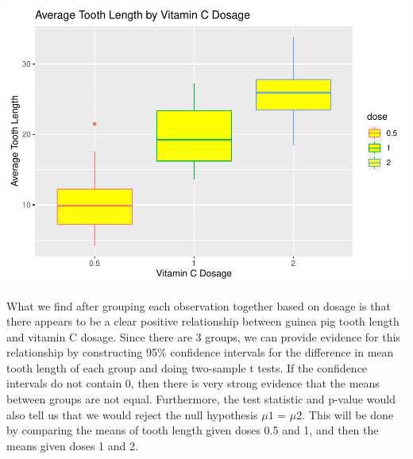 \documentclass[
]{article}
\newenvironment{Shaded}{\begin{snugshade}}{\end{snugshade}}
\newcommand{\DataTypeTok}[1]{\textcolor[rgb]{0.13,0.29,0.53}{#1}}
\newcommand{\KeywordTok}[1]{\textcolor[rgb]{0.13,0.29,0.53}{\textbf{#1}}}
\newcommand{\NormalTok}[1]{#1}
\newcommand{\OperatorTok}[1]{\textcolor[rgb]{0.81,0.36,0.00}{\textbf{#1}}}
\newcommand{\StringTok}[1]{\textcolor[rgb]{0.31,0.60,0.02}{#1}}
\begin{document}
\begin{Shaded}
\end{Shaded}

\includegraphics{C6Project_files/figure-latex/groupdose-1.pdf}

What we find after grouping each observation together based on dosage is
that there appears to be a clear positive relationship between guinea
pig tooth length and vitamin C dosage. Since there are 3 groups, we can
provide evidence for this relationship by constructing 95\% confidence
intervals for the difference in mean tooth length of each group and
doing two-sample t tests. If the confidence intervals do not contain 0,
then there is very strong evidence that the means between groups are not
equal. Furthermore, the test statistic and p-value would also tell us
that we would reject the null hypothesis \(\mu1\) = \(\mu2\). This will
be done by comparing the means of tooth length given doses 0.5 and 1,
and then the means given doses 1 and 2.
\end{document}
